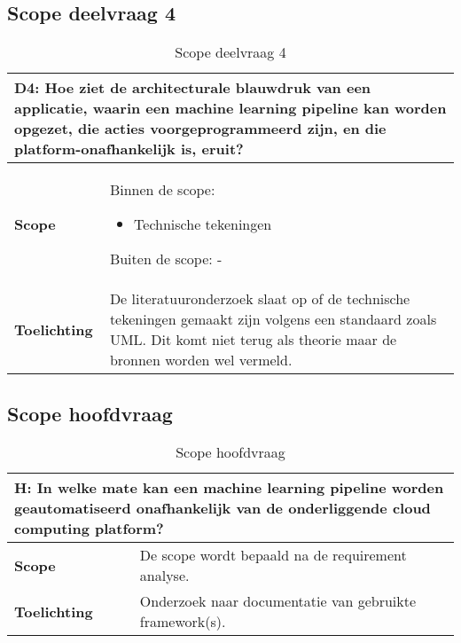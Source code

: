 \subsection*{Scope deelvraag 4}\label{appendix:scope-subquestion-4}
\begin{table}[hbt!]
  \centering
  \begin{tabular}{|p{.215\linewidth}|p{.72\linewidth}|}
  \hline
  \multicolumn{2}{|p{.97\linewidth}|}{\textbf{D4: Hoe ziet de architecturale blauwdruk van een applicatie, waarin een machine learning pipeline kan worden opgezet, die acties voorgeprogrammeerd zijn, en die platform-onafhankelijk is, eruit?}} \\ \hline
    \textbf{Scope}&
      Binnen de scope:
      \begin{itemize}
        \item Technische tekeningen
      \end{itemize}
      Buiten de scope:
      -
    \\ \hline
    \textbf{Toelichting}&
      De literatuuronderzoek slaat op of de technische tekeningen gemaakt zijn volgens een standaard zoals UML. Dit komt niet terug als theorie maar de bronnen worden wel vermeld.
    \\ \hline
  \end{tabular}
  \caption{Scope deelvraag 4}
  \label{table:scope-subquestion-4}
\end{table}

\subsection*{Scope hoofdvraag}\label{appendix:scope-main-question}
\begin{table}[hbt!]
  \centering
  \begin{tabular}{|p{.215\linewidth}|p{.72\linewidth}|}
  \hline
  \multicolumn{2}{|p{.97\linewidth}|}{\textbf{H: In welke mate kan een machine learning pipeline worden geautomatiseerd onafhankelijk van de onderliggende cloud computing platform?}} \\ \hline
    \textbf{Scope}&
      De scope wordt bepaald na de requirement analyse.
    \\ \hline
    \textbf{Toelichting}&
      Onderzoek naar documentatie van gebruikte framework(s).
    \\ \hline
  \end{tabular}
  \caption{Scope hoofdvraag}
  \label{table:scope-main-question}
\end{table}

\newpage